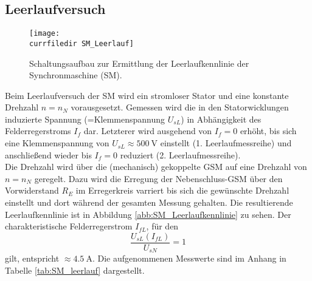 \subsection{Leerlaufversuch}
\label{subsec:leerlauf}
\begin{figure}
    \centering
    \texttt{[image: \\currfiledir SM\_Leerlauf]}
    \caption{Schaltungsaufbau zur Ermittlung der Leerlaufkennlinie der Synchronmaschine (SM).}
    \label{fig:SM_Leerlauf}
\end{figure}
Beim Leerlaufversuch der SM wird ein stromloser Stator und eine konstante Drehzahl $n=n_N$ vorausgesetzt. Gemessen wird die in den Statorwicklungen induzierte Spannung (=Klemmenspannung $U_{sL}$) in Abhängigkeit des Felderregerstroms $I_f$ dar. Letzterer wird ausgehend von $I_f=0$ erhöht, bis sich eine Klemmenspannung von $U_{sL}\approx\SI{500}{\volt}$ einstellt (1. Leerlaufmessreihe) und anschließend wieder bis $I_f=0$ reduziert (2. Leerlaufmessreihe).\\
Die Drehzahl wird über die (mechanisch) gekoppelte GSM auf eine Drehzahl von $n=n_N$ geregelt. Dazu wird die Erregung der Nebenschluss-GSM über den Vorwiderstand $R_E$ im Erregerkreis varriert bis sich die gewünschte Drehzahl einstellt und dort während der gesamten Messung gehalten. Die resultierende Leerlaufkennlinie ist in Abbildung \ref{abb:SM_Leerlaufkennlinie} zu sehen. Der charakteristische Felderregerstrom $I_{fL}$, für den
\begin{equation*}
    \frac{U_{sL}(I_{fL})}{U_{sN}} = 1 
\end{equation*}
gilt, entspricht $\approx\SI{4.5}{\ampere}$. Die aufgenommenen Messwerte sind im Anhang in Tabelle \ref{tab:SM_leerlauf} dargestellt.


